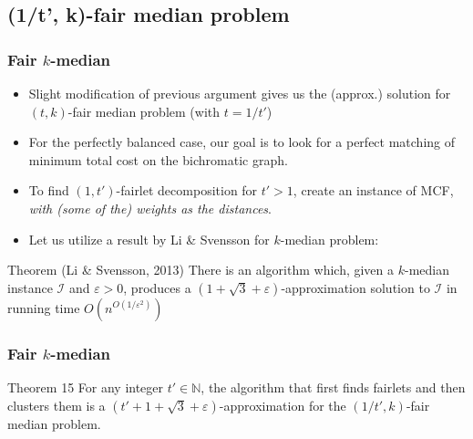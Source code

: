\documentclass{beamer}
\begin{document}

\subsection{(1/t', k)-fair median problem}

\begin{frame}
\frametitle{Fair $k$-median}

\begin{itemize}
	\item Slight modification of previous argument gives us the (approx.) solution for $(t, k)$-fair median problem (with $t = 1/t'$) \pause
	
	\item For the perfectly balanced case, our goal is to look for a \alert{perfect matching of minimum total cost} on the bichromatic graph. \pause
	
	\item To find $(1, t')$-fairlet decomposition for $t' > 1$, create an instance of MCF, {\it with (some of the) weights as the distances}. \pause
	
	\item Let us utilize a result by Li \& Svensson for $k$-median problem:
\end{itemize}

\begin{block}{Theorem (Li \& Svensson, 2013)}
There is an algorithm which, given a $k$-median instance $\mathcal{I}$ and $\varepsilon > 0$, produces a $(1 + \sqrt{3} + \varepsilon)$-approximation solution to $\mathcal{I}$ in running time $O \left( n^{O(1 / \varepsilon^2)} \right)$

\end{block}

\end{frame}



\begin{frame}
\frametitle{Fair $k$-median}

\begin{block}{Theorem 15}
For any integer $t' \in \mathbb{N}$, the algorithm that first finds fairlets and then clusters them is a \alert{$(t' + 1 + \sqrt{3} + \varepsilon)$-approximation} for the $(1/t', k)$-fair median problem.

\end{block}

\end{frame}
\end{document}
